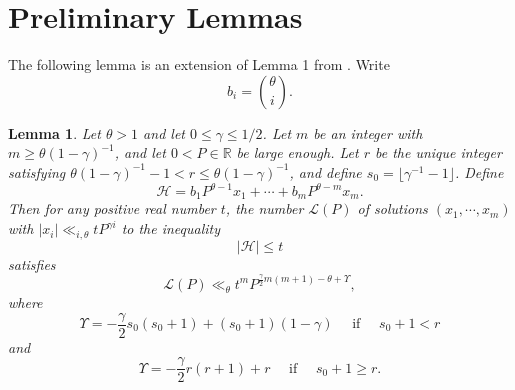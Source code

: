 \documentclass[11pt,reqno]{amsart}
\newtheorem{lemma}{Lemma}[section]
\numberwithin{equation}{section}
\begin{document}
\section{Preliminary Lemmas} \label{sec:prelim}
The following lemma is an extension of Lemma 1 from \cite{ArkhZhit}. Write 
\[ b_i = \binom{\theta}{i}. \]

\begin{lemma} \label{lem:arkzhit}
Let $\theta > 1$ and let $0 \leq \gamma \leq 1/2$. Let $m$ be an integer with $m \geq \theta(1-\gamma)^{-1} $, and let $0 < P \in \mathbb{R}$ be large enough. Let $r$ be the unique integer satisfying $\theta(1-\gamma)^{-1}-1 < r \leq \theta(1-\gamma)^{-1}$, and define $s_0 = \lfloor \gamma^{-1}-1\rfloor $. Define 
\[\mathcal{H} = b_1P^{\theta-1}x_1+\cdots+b_mP^{\theta-m}x_m. \]
Then for any positive real number $t$, the number $\mathcal{L}(P)$ of solutions $(x_1, \cdots, x_m)$ with $|x_i| \ll_{i, \theta} tP^{\gamma i}$ to the inequality 
\[ |\mathcal{H}| \leq t \]
satisfies 
\[ \mathcal{L}(P) \ll_{\theta} t^mP^{\frac{\gamma}{2}m(m+1)-\theta+ \Upsilon}, \]
where 
\[ \Upsilon = -\frac{\gamma}{2}s_0(s_0+1)+(s_0+1)(1-\gamma) \quad \text{ if } \quad s_0+1 < r \]
and 
\[ \Upsilon = -\frac{\gamma}{2}r(r+1)+r \quad \text{ if } \quad s_0+1 \geq r. \] 
\end{lemma}
\end{document}

